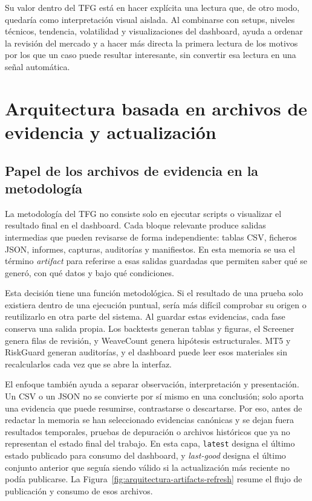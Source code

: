 Su valor dentro del TFG est\'a en hacer expl\'icita una lectura que, de otro modo,
quedar\'ia como interpretaci\'on visual aislada. Al combinarse con setups, niveles
t\'ecnicos, tendencia, volatilidad y visualizaciones del dashboard, ayuda a
ordenar la revisi\'on del mercado y a hacer m\'as directa la primera lectura de
los motivos por los que un caso puede resultar interesante, sin convertir esa
lectura en una se\~nal autom\'atica.

\section{Arquitectura basada en archivos de evidencia y actualizaci\'on}
\label{sec:arquitectura-artifact-first-refresh}

\subsection{Papel de los archivos de evidencia en la metodolog\'ia}
\label{subsec:papel-artifacts-metodologia}

La metodolog\'ia del TFG no consiste solo en ejecutar scripts o visualizar el
resultado final en el dashboard. Cada bloque relevante produce salidas
intermedias que pueden revisarse de forma independiente: tablas CSV, ficheros
JSON, informes, capturas, auditor\'ias y manifiestos. En esta memoria se usa el
t\'ermino \textit{artifact} para referirse a esas salidas guardadas que permiten
saber qu\'e se gener\'o, con qu\'e datos y bajo qu\'e condiciones.

Esta decisi\'on tiene una funci\'on metodol\'ogica. Si el resultado de una prueba
solo existiera dentro de una ejecuci\'on puntual, ser\'ia m\'as dif\'icil comprobar
su origen o reutilizarlo en otra parte del sistema. Al guardar estas evidencias,
cada fase conserva una salida propia. Los backtests generan tablas y figuras,
el Screener genera filas de revisi\'on, y WeaveCount genera hip\'otesis
estructurales. MT5 y RiskGuard generan auditor\'ias, y el dashboard puede leer
esos materiales sin recalcularlos cada vez que se abre la interfaz.

El enfoque tambi\'en ayuda a separar observaci\'on, interpretaci\'on y
presentaci\'on. Un CSV o un JSON no se convierte por s\'i mismo en una conclusi\'on;
solo aporta una evidencia que puede resumirse, contrastarse o descartarse. Por
eso, antes de redactar la memoria se han seleccionado evidencias can\'onicas y se
dejan fuera resultados temporales, pruebas de depuraci\'on o archivos
hist\'oricos que ya no representan el estado final del trabajo. En esta capa,
\texttt{latest} designa el \'ultimo estado publicado para consumo del dashboard,
y \textit{last-good} designa el \'ultimo conjunto anterior que segu\'ia siendo
v\'alido si la actualizaci\'on m\'as reciente no pod\'ia publicarse.
La Figura~\ref{fig:arquitectura-artifacts-refresh} resume el flujo de
publicaci\'on y consumo de esos archivos.

